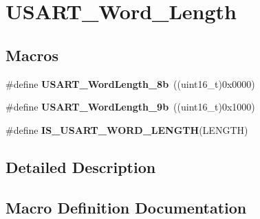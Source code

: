 \hypertarget{group___u_s_a_r_t___word___length}{}\section{U\+S\+A\+R\+T\+\_\+\+Word\+\_\+\+Length}
\label{group___u_s_a_r_t___word___length}
\subsection*{Macros}
\begin{DoxyCompactItemize}
\item 
\#define {\bfseries U\+S\+A\+R\+T\+\_\+\+Word\+Length\+\_\+8b}~((uint16\+\_\+t)0x0000)\hypertarget{group___u_s_a_r_t___word___length_ga08682faddc657df85a93627b5a146c25}{}\label{group___u_s_a_r_t___word___length_ga08682faddc657df85a93627b5a146c25}

\item 
\#define {\bfseries U\+S\+A\+R\+T\+\_\+\+Word\+Length\+\_\+9b}~((uint16\+\_\+t)0x1000)\hypertarget{group___u_s_a_r_t___word___length_gae7dd162142660e09e2321aa3f33dc4d2}{}\label{group___u_s_a_r_t___word___length_gae7dd162142660e09e2321aa3f33dc4d2}

\item 
\#define {\bfseries I\+S\+\_\+\+U\+S\+A\+R\+T\+\_\+\+W\+O\+R\+D\+\_\+\+L\+E\+N\+G\+TH}(L\+E\+N\+G\+TH)
\end{DoxyCompactItemize}


\subsection{Detailed Description}


\subsection{Macro Definition Documentation}
